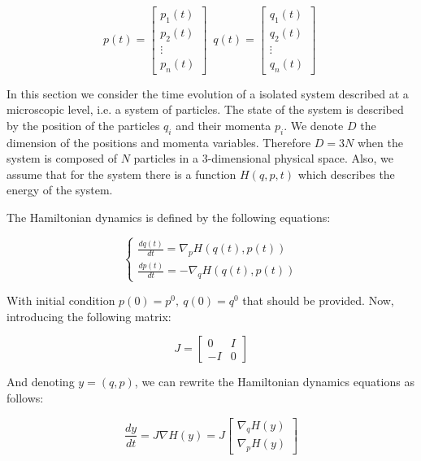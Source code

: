 \documentclass{article}
\begin{document}
\begin{equation*}
	p(t) = \begin{bmatrix} p_1(t) \\ p_2(t) \\ \vdots \\ p_n(t) \end{bmatrix} \; \ 
	q(t) = \begin{bmatrix} q_1(t) \\ q_2(t) \\ \vdots \\ q_n(t) \end{bmatrix} \;
\end{equation*}

In this section we consider the time evolution of a isolated system described at a microscopic level, i.e. a system of particles. The state of the system is described by the position of the particles \(q_i\) and their momenta \(p_i\). We denote \(D\) the dimension of the positions and momenta variables. Therefore \(D = 3N\) when the system is composed of \(N\) particles in a 3-dimensional physical space. Also, we assume that for the system there is a function \(H(q,p,t)\) which describes the energy of the system.

The Hamiltonian dynamics is defined by the following equations:

\begin{equation} 
	\label{eq:hamiltoniandynamics1} 
	\begin{cases}
		\frac{dq(t)}{dt} = \nabla_p H(q(t), p(t)) \\
		\frac{dp(t)}{dt} = -\nabla_q H(q(t), p(t))
	\end{cases}
\end{equation}

With initial condition \(p(0)=p^0, \ q(0)=q^0\) that should be provided. Now, introducing the following matrix:

\begin{equation*}
	J = \begin{bmatrix} 0 & I \\ -I & 0 \end{bmatrix}
\end{equation*}

And denoting \(y = (q,p)\), we can rewrite the Hamiltonian dynamics equations as follows:

\begin{equation} 
	\frac{dy}{dt} = J \nabla H(y) = J \begin{bmatrix} \nabla_q H(y) \\ \nabla_p H(y) \end{bmatrix}
	\label{eq:hamiltoniandynamics2} 
\end{equation}
\end{document}
